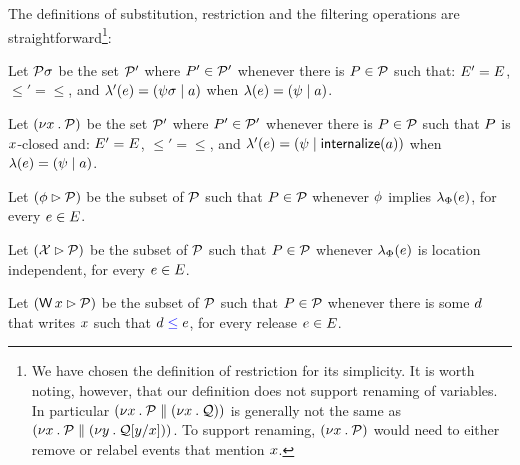 The definitions of substitution, restriction and the filtering operations %
are straightforward\footnote{We have chosen the definition of restriction for
  its simplicity.  It is worth noting, however, that our definition does not
  support renaming of variables.  In particular
  $(\nu x\mathbin.\mathcal{P}\parallel(\nu x\mathbin.\mathcal{Q}))$ is generally not the same
  as $(\nu x\mathbin.\mathcal{P}\parallel(\nu y\mathbin.\mathcal{Q}[y/x]))$.  To
  support renaming, $(\nu x\mathbin.\mathcal{P})$ would need to either remove or
  relabel events that mention $x$.}:
\begin{definition}
  Let $\mathcal{P}\sigma$ be the set $\mathcal{P}'$ where $P'\in\mathcal{P}'$ whenever
there is $P\in\mathcal{P}$ such that:
$E' = E$,
${\le'} = {\le}$, 
and
$\lambda'(e) = (\psi\sigma \mid a)$ when $\lambda(e) = (\psi \mid a)$.


Let $(\nu x\mathbin.\mathcal{P})$ be the set $\mathcal{P}'$ where $P'\in\mathcal{P}'$ whenever
there is $P\in\mathcal{P}$ such that $P$ is $x$-closed and:
$E' = E$,
${\le'} = {\le}$, 
and
$\lambda'(e) = (\psi \mid \mathsf{internalize}(a))$ when $\lambda(e) = (\psi \mid a)$.

Let $(\phi \mathbin\rhd \mathcal{P})$ be the subset of $\mathcal{P}$ such that $P\in\mathcal{P}$ whenever
$\phi$ implies $\lambda_{\Phi}(e)$, for every $e\in E$. %

Let $(\mathcal{X}\mathbin\rhd \mathcal{P})$ be the subset of $\mathcal{P}$ such that
$P\in\mathcal{P}$ whenever $\lambda_{\Phi}(e)$ is location independent, for every $e\in E$.

Let $(\DW{\aLoc}{} \guard \aPSS)$ be the subset of $\mathcal{P}$ such that
$P\in\mathcal{P}$ whenever there is some $d$ that writes $x$ such that
$d\mathrel{{\color{blue}\leq}}e$, for every release $e\in E$.
\end{definition}


